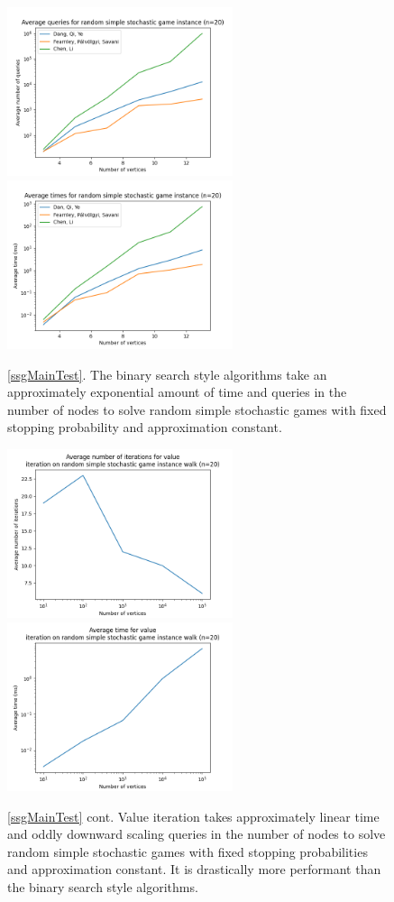   \vspace{-22pt}
  \begin{figure}[H] 
      \centering
      \includegraphics[width=2.6in]{plots/simple_queries.png}
      \centering
      \includegraphics[width=2.6in]{plots/simple_times.png}
      \caption{\cref{ssgMainTest}. The binary search style algorithms take an approximately exponential
      amount of time and queries in the number of nodes
      to solve random simple stochastic games with fixed stopping probability
      and approximation constant.} \label{simpleMainPlot}
  \end{figure}
  \vspace{-20pt}
  \begin{figure}[H]
      \centering
      \includegraphics[width=2.6in]{plots/simple_iterations.png}
      \centering
      \includegraphics[width=2.6in]{plots/simple_iter_time.png}
      \caption{\cref{ssgMainTest} cont. Value iteration takes approximately linear time and oddly downward scaling
      queries in the number of nodes
      to solve random simple stochastic games with fixed stopping probabilities and approximation constant.
      It is drastically more performant than
      the binary search style algorithms.} \label{simpleWalkPlot}
  \end{figure}
